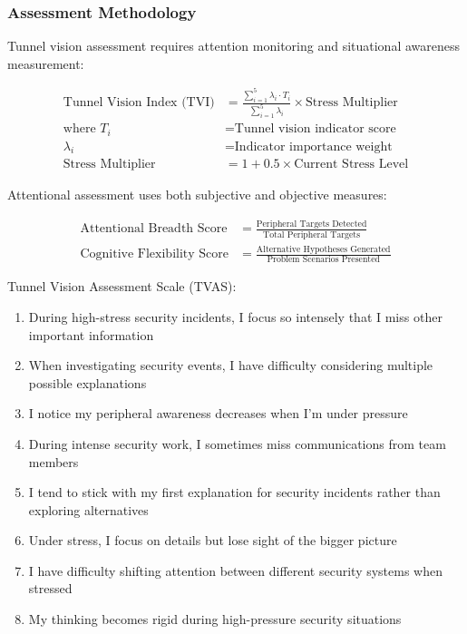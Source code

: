 \documentclass[11pt,a4paper]{article}
\begin{document}
\subsubsection{Assessment Methodology}

Tunnel vision assessment requires attention monitoring and situational awareness measurement:

\begin{align}
\text{Tunnel Vision Index (TVI)} &= \frac{\sum_{i=1}^{5} \lambda_i \cdot T_i}{\sum_{i=1}^{5} \lambda_i} \times \text{Stress Multiplier} \\
\text{where } T_i &= \text{Tunnel vision indicator score} \\
\lambda_i &= \text{Indicator importance weight} \\
\text{Stress Multiplier} &= 1 + 0.5 \times \text{Current Stress Level}
\end{align}

Attentional assessment uses both subjective and objective measures:

\begin{align}
\text{Attentional Breadth Score} &= \frac{\text{Peripheral Targets Detected}}{\text{Total Peripheral Targets}} \\
\text{Cognitive Flexibility Score} &= \frac{\text{Alternative Hypotheses Generated}}{\text{Problem Scenarios Presented}}
\end{align}

Tunnel Vision Assessment Scale (TVAS):

\begin{enumerate}
\item During high-stress security incidents, I focus so intensely that I miss other important information
\item When investigating security events, I have difficulty considering multiple possible explanations
\item I notice my peripheral awareness decreases when I'm under pressure
\item During intense security work, I sometimes miss communications from team members
\item I tend to stick with my first explanation for security incidents rather than exploring alternatives
\item Under stress, I focus on details but lose sight of the bigger picture
\item I have difficulty shifting attention between different security systems when stressed
\item My thinking becomes rigid during high-pressure security situations
\end{enumerate}
\end{document}
